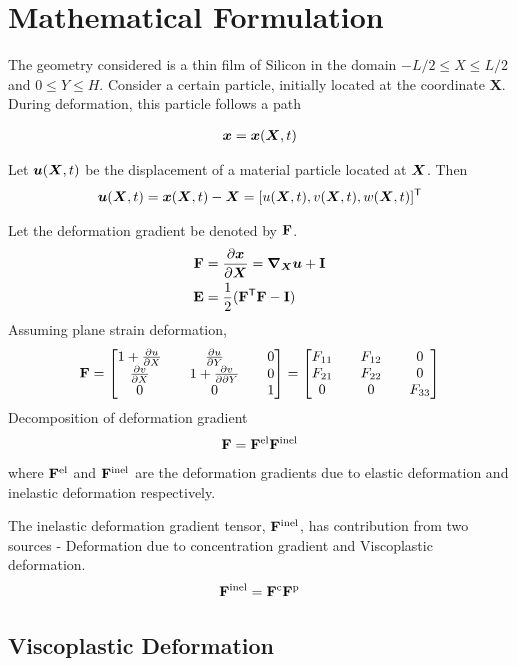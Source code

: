 \documentclass[../main.tex]{subfiles}
\begin{document}
\section{Mathematical Formulation}
The geometry considered is a thin film of Silicon in the domain $ -L/2 \le X \le L/2$ and $0 \le Y \le H$. Consider a certain particle, initially located at the coordinate \textbf{X}. During deformation, this particle follows a path 


\begin{gather}
{\bm{x}} = {\bm{x}}({\bm{X}},t)
\end{gather}

\vspace{0.25cm}
Let ${\bm{u}}({\bm{X}}, t)$ be the displacement of a material particle located at ${\bm{X}}$. Then
\begin{align}
    {\bm{u}}({\bm{X}}, t) = {\bm{x}}({\bm{X}}, t) - {\bm{X}} = [u({\bm{X}}, t), v({\bm{X}}, t), w({\bm{X}}, t)]^{{\sf {T}}}
\end{align}

Let the deformation gradient be denoted by $\mathbf{F}$.
\begin{align}
    \mathbf{F} &= \frac{\partial {\bm{x}}}{\partial {\bm{X}}} = \bm{\nabla}_{\bm{X}} {\bm{u}} + \mathbf{I} \\
    \mathbf{E} &= \frac{1}{2}(\mathbf{F}^{\sf {T}} \mathbf{F} - \mathbf{I})
\end{align}
Assuming plane strain deformation, 
\begin{align}
\mathbf{F} = 
\begin{bmatrix}
       1 + \frac{\partial u}{\partial X} && \frac{\partial u}{\partial Y} && 0 \\
       \frac{\partial v}{\partial X} && 1 + \frac{\partial v}{\partial \partial Y} && 0 \\
       0 && 0 && 1
\end{bmatrix} = \begin{bmatrix} F_{11} && F_{12} && 0 \\ F_{21} && F_{22} && 0 \\ 0 && 0 && F_{33} \end{bmatrix}
\end{align}
Decomposition of deformation gradient
\begin{gather}
\mathbf{F} = \mathbf{F}^{{\rm{el}}} \mathbf{F}^{{\rm{inel}}}
\end{gather}
where $\mathbf{F}^{{\rm{el}}}$ and $\mathbf{F}^{{\rm{inel}}}$ are the deformation gradients due to elastic deformation and inelastic deformation respectively.

The inelastic deformation gradient tensor, $\mathbf{F}^{{\rm{inel}}}$, has contribution from two sources - Deformation due to concentration gradient and Viscoplastic deformation.
\begin{align}
    \mathbf{F}^{\rm{inel}} = \mathbf{F}^{\rm{c}} \mathbf{F}^{\rm{p}}
\end{align}


\subsection{Viscoplastic Deformation}
\end{document}
